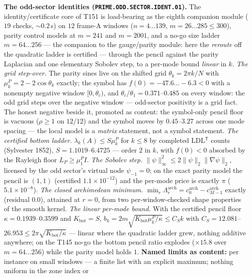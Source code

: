 \par\smallskip\noindent\textbf{The odd-sector identities
(\texttt{PRIME.ODD.SECTOR.IDENT.01}).}
The identity/certificate core of T151 is load-bearing as the eighth
companion module ($19$ checks, ${\sim}0.2$\,s) on $12$ frame-A windows
($n=4\ldots139$, $m=26\ldots285\le300$), parity control models at $m=241$
and $m=2001$, and a no-go size ladder $m=64\ldots256$ --- the companion to
the gauge/parity module: here the \emph{reroute} off the quadratic ladder
is certified --- through the pencil against the parity Laplacian and one
elementary Sobolev step, to a per-mode bound \emph{linear} in $k$.
\emph{The grid step-over.} The parity sines live on the shifted grid
$\theta_k=2\pi k/N$ with $\mu^P_k=2-2\cos\theta_k$ exactly; the symbol has
$f(0)=-47.6\ldots-6.3<0$ with a nonempty negative window $[0,\theta_c)$,
and $\theta_c/\theta_1=0.371$--$0.485$ on every window: the odd grid steps
over the negative window --- odd-sector positivity is a grid fact. The
honest negative beside it, promoted as content: the symbol-only pencil
floor is vacuous ($\rho\ge1$ on $12/12$) and the symbol moves by
$0.45$--$3.27$ across one mode spacing --- the local model is a
\emph{matrix} statement, not a symbol statement.
\emph{The certified bottom ladder.} $\lambda_k(A)\le S\mu^P_k$ for $k\le8$
by completed LDL$^{\mathsf T}$ counts (Sylvester 1852), $S=1.1019$--$6.4725$
--- order $2$ in $k$, with $f(0)<0$ absorbed by the Rayleigh floor
$L_P\ge\mu^P_1I$.
\emph{The Sobolev step.} $\|\psi\|_\infty^2\le2\|\psi\|_2\|\nabla\psi\|_2$,
licensed by the odd sector's virtual node $\psi_{-1}=0$; on the exact
parity model the pencil is $(1,1)$ (certified $1.1\times10^{-12}$) and the
per-mode price is exactly $\pi$ ($5.1\times10^{-8}$).
\emph{The closed archimedean minimum.}
$\min_r\Lambda^{\mathrm{arch}}_r=c^{\mathrm{arch}}_0-c^{\mathrm{arch}}_{M-1}$
exactly (residual $0.0$), attained at $r=0$, from two per-window-checked
shape properties of the smooth kernel.
\emph{The linear per-mode bound.} With the certified pencil floor
$\kappa=0.1939$--$0.3599$ and $K_{\mathrm{bot}}=S$,
$b_k=2m\sqrt{K_{\mathrm{bot}}\mu^P_k/\kappa}\le C_Sk$ with
$C_S=12.081$--$26.953\le2\pi\sqrt{K_{\mathrm{bot}}/\kappa}$ --- linear
where the quadratic ladder grew, nothing additive anywhere; on the T145
no-go the bottom pencil ratio explodes ($\times15.8$ over $m=64\ldots256$)
while the parity model holds $1$.
\textbf{Named limits as content:} per instance on small windows --- a
finite list with an explicit maximum; nothing uniform in the zone index or
